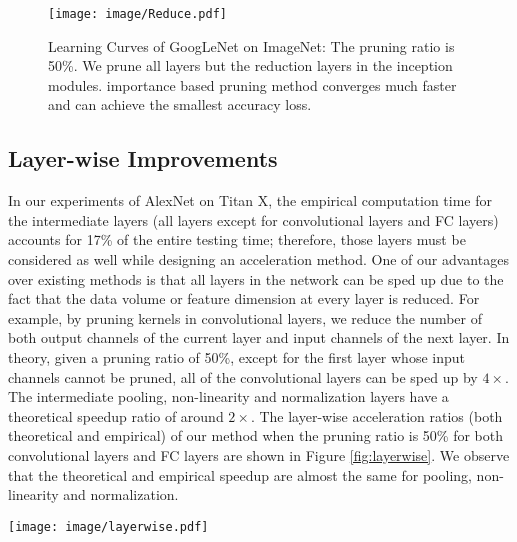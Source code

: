 \documentclass[10pt,twocolumn,letterpaper]{article}
\begin{document}
\begin{figure}[!t]
\begin{center}
  \texttt{[image: image/Reduce.pdf]}
\end{center}
  \caption{Learning Curves of GoogLeNet on ImageNet: The pruning ratio is 50\%. We prune all layers but the reduction layers in the inception modules. importance based pruning method converges much faster and can achieve the smallest accuracy loss. }
\label{fig:googRe}
\end{figure}\subsection{Layer-wise Improvements}
In our experiments of AlexNet on Titan X, the empirical computation time for the intermediate layers (all layers except for convolutional layers and FC layers) accounts for 17\% of the entire testing time; therefore, those layers must be considered as well while designing an acceleration method.
One of our advantages over existing methods is that all layers in the network can be sped up due to the fact that the data volume or feature dimension at every layer is reduced.
For example, by pruning kernels in convolutional layers, we reduce the number of both output channels of the current layer and input channels of the next layer. 
In theory, given a pruning ratio of 50\%, except for the first layer whose input channels cannot be pruned, all of the convolutional layers can be sped up by $4\times$. 
The intermediate pooling, non-linearity and normalization layers have a theoretical speedup ratio of around $2\times$. 
The layer-wise acceleration ratios (both theoretical and empirical) of our method when the pruning ratio is 50\% for both convolutional layers and FC layers are shown in Figure \ref{fig:layerwise}. 
We observe that the theoretical and empirical speedup are almost the same for pooling, non-linearity and normalization.
\begin{center}
  \texttt{[image: image/layerwise.pdf]}
\end{center}
  \caption{Full-Network Acceleration of AlexNet: Pruning Half of the Kernels and Neurons. }
\label{fig:layerwise}
\end{document}
